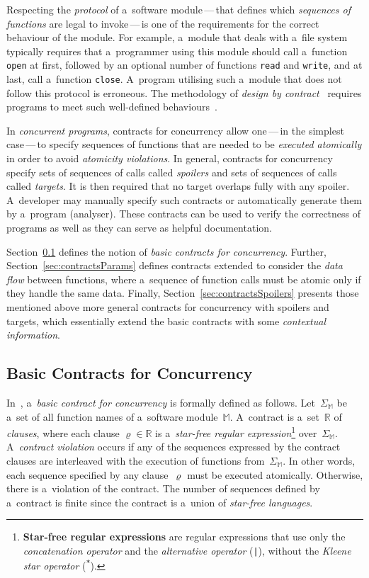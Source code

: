 Respecting the \emph{protocol} of a~software module\,---\,that defines which \emph{sequences of functions} are legal to invoke\,---\,is one of the requirements for the correct behaviour of the module. For example, a~module that deals with a~file system typically requires that a~programmer using this module should call a~function \texttt{open} at first, followed by an optional number of functions \texttt{read} and \texttt{write}, and at last, call a~function \texttt{close}. A~program utilising such a~module that does not follow this protocol is erroneous. The methodology of \emph{design by contract}~\cite{contract} requires programs to meet such well-defined behaviours~\cite{contracts2015}.

In \emph{concurrent programs}, contracts for concurrency allow one\,---\,in the simplest case\,---\,to specify sequences of functions that are needed to be \emph{executed atomically} in order to avoid \emph{atomicity violations}. In general, contracts for concurrency specify sets of sequences of calls called \emph{spoilers} and sets of sequences of calls called \emph{targets}. It is then required that no target overlaps fully with any spoiler. A~developer may manually specify such contracts or automatically generate them by a~program (analyser). These contracts can be used to verify the correctness of programs as well as they can serve as helpful documentation.

Section~\ref{sec:contractsBasic} defines the notion of \emph{basic contracts for concurrency}. Further, Section~\ref{sec:contractsParams} defines contracts extended to consider the \emph{data flow} between functions, where a~sequence of function calls must be atomic only if they handle the same data. Finally, Section~\ref{sec:contractsSpoilers} presents those mentioned above more general contracts for concurrency with spoilers and targets, which essentially extend the basic contracts with some \emph{contextual information}.

\subsection{Basic Contracts for Concurrency}
\label{sec:contractsBasic}

In~\cite{contracts2017, contracts2015}, a~\emph{basic contract for concurrency} is formally defined as follows. Let~$ \Sigma_\mathbb{M} $ be a~set of all function names of a~software module~$ \mathbb{M} $. A~contract is a~set~$ \mathbb{R} $ of \emph{clauses}, where each clause $ \varrho \in \mathbb{R} $ is a~\emph{star-free regular expression}\footnote{\textbf{Star-free regular expressions} are regular expressions that use only the \emph{concatenation operator} and the \emph{alternative operator} (\texttt{|}), without the \emph{Kleene star operator} (\texttt{\textsuperscript{*}}).} over~$ \Sigma_\mathbb{M} $. A~\emph{contract violation} occurs if any of the sequences expressed by the contract clauses are interleaved with the execution of functions from~$ \Sigma_\mathbb{M} $. In other words, each sequence specified by any clause~$ \varrho $ must be executed atomically. Otherwise, there is a~violation of the contract. The number of sequences defined by a~contract is finite since the contract is a~union of \emph{star-free languages}.

